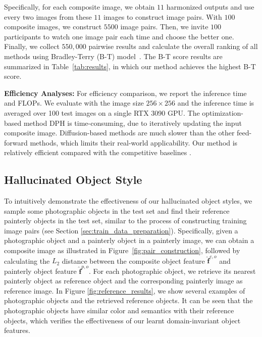 \documentclass[letterpaper]{article} %
\begin{document}
Specifically, for each composite image, we obtain $11$ harmonized outputs and use every two images from these $11$ images to construct image pairs. With $100$ composite images, we construct $5500$ image pairs. Then, we invite $100$ participants to watch one image pair each time and choose the better one. Finally, we collect $550,000$ pairwise results and calculate the overall ranking of all methods using Bradley-Terry (B-T) model~\cite{bradley1952rank,lai2016comparative}. The B-T score results are summarized in Table~\ref{tab:results}, in which our method achieves the highest B-T score.


\textbf{Efficiency Analyses:} For efficiency comparison, we report the inference time and FLOPs. We evaluate with the image size $256 \times 256$ and the inference time is averaged over 100 test images on a single RTX 3090 GPU.
The optimization-based method DPH is time-consuming, due to iteratively updating the input composite image. Diffusion-based methods are much slower than the other feed-forward methods, which limits their real-world applicability.
Our method is relatively efficient compared with the competitive baselines \cite{cao2022painterly,luan2018deep}.









\subsection{Hallucinated Object Style}
To intuitively demonstrate the effectiveness of our hallucinated object styles, we sample some photographic objects in the test set and find their reference painterly objects in the test set, similar to the process of constructing training image pairs (see Section \ref{sec:train_data_preparation}). Specifically, given a photographic object and a painterly object in a painterly image, we can obtain a composite image as illustrated in Figure~\ref{fig:pair_construction}, followed by calculating the $L_2$ distance between the composite object feature $\hat{\bm{f}}^{c,o}$ and painterly object feature $\hat{\bm{f}}^{p,o}$. For each photographic object, we retrieve its nearest painterly object as reference object and the corresponding painterly image as reference image. In Figure \ref{fig:reference_results}, we show several examples of photographic objects and the retrieved reference objects. It can be seen that the photographic objects have similar color and semantics with their reference objects, which verifies the effectiveness of our learnt domain-invariant object features. %
\end{document}
